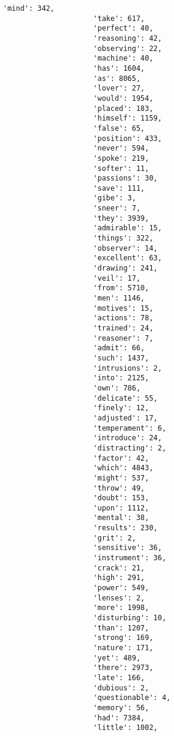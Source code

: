 \documentclass[11pt]{article}
\begin{document}
\begin{Verbatim}[commandchars=\\\{\}]
                     'mind': 342,
                     'take': 617,
                     'perfect': 40,
                     'reasoning': 42,
                     'observing': 22,
                     'machine': 40,
                     'has': 1604,
                     'as': 8065,
                     'lover': 27,
                     'would': 1954,
                     'placed': 183,
                     'himself': 1159,
                     'false': 65,
                     'position': 433,
                     'never': 594,
                     'spoke': 219,
                     'softer': 11,
                     'passions': 30,
                     'save': 111,
                     'gibe': 3,
                     'sneer': 7,
                     'they': 3939,
                     'admirable': 15,
                     'things': 322,
                     'observer': 14,
                     'excellent': 63,
                     'drawing': 241,
                     'veil': 17,
                     'from': 5710,
                     'men': 1146,
                     'motives': 15,
                     'actions': 78,
                     'trained': 24,
                     'reasoner': 7,
                     'admit': 66,
                     'such': 1437,
                     'intrusions': 2,
                     'into': 2125,
                     'own': 786,
                     'delicate': 55,
                     'finely': 12,
                     'adjusted': 17,
                     'temperament': 6,
                     'introduce': 24,
                     'distracting': 2,
                     'factor': 42,
                     'which': 4843,
                     'might': 537,
                     'throw': 49,
                     'doubt': 153,
                     'upon': 1112,
                     'mental': 38,
                     'results': 230,
                     'grit': 2,
                     'sensitive': 36,
                     'instrument': 36,
                     'crack': 21,
                     'high': 291,
                     'power': 549,
                     'lenses': 2,
                     'more': 1998,
                     'disturbing': 10,
                     'than': 1207,
                     'strong': 169,
                     'nature': 171,
                     'yet': 489,
                     'there': 2973,
                     'late': 166,
                     'dubious': 2,
                     'questionable': 4,
                     'memory': 56,
                     'had': 7384,
                     'little': 1002,

\end{Verbatim}
\end{document}
